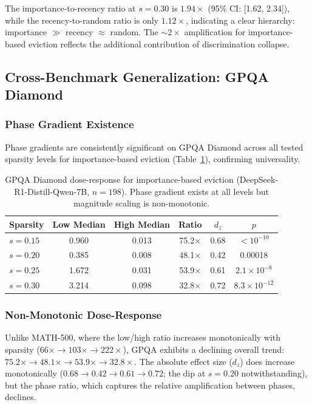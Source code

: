 \documentclass[11pt]{article}
\begin{document}
The importance-to-recency ratio at $s=0.30$ is $1.94\times$ (95\% CI: [1.62, 2.34]), while the recency-to-random ratio is only $1.12\times$, indicating a clear hierarchy: importance $\gg$ recency $\approx$ random. The $\sim$$2\times$ amplification for importance-based eviction reflects the additional contribution of discrimination collapse.

\subsection{Cross-Benchmark Generalization: GPQA Diamond}

\subsubsection{Phase Gradient Existence}

Phase gradients are consistently significant on GPQA Diamond across all tested sparsity levels for importance-based eviction (Table~\ref{tab:gpqa_full}), confirming universality.

\begin{table}[h]
\centering
\caption{GPQA Diamond dose-response for importance-based eviction (DeepSeek-R1-Distill-Qwen-7B, $n=198$). Phase gradient exists at all levels but magnitude scaling is non-monotonic.}
\label{tab:gpqa_full}
\begin{tabular}{lccccc}
\toprule
Sparsity & Low Median & High Median & Ratio & $d_z$ & $p$ \\
\midrule
$s=0.15$ & 0.960 & 0.013 & 75.2$\times$ & 0.68 & $<10^{-10}$ \\
$s=0.20$ & 0.385 & 0.008 & 48.1$\times$ & 0.42 & 0.00018 \\
$s=0.25$ & 1.672 & 0.031 & 53.9$\times$ & 0.61 & $2.1 \times 10^{-8}$ \\
$s=0.30$ & 3.214 & 0.098 & 32.8$\times$ & 0.72 & $8.3 \times 10^{-12}$ \\
\bottomrule
\end{tabular}
\end{table}

\subsubsection{Non-Monotonic Dose-Response}

Unlike MATH-500, where the low/high ratio increases monotonically with sparsity ($66\times \to 103\times \to 222\times$), GPQA exhibits a declining overall trend: $75.2\times \to 48.1\times \to 53.9\times \to 32.8\times$. The absolute effect size ($d_z$) does increase monotonically ($0.68 \to 0.42 \to 0.61 \to 0.72$; the dip at $s=0.20$ notwithstanding), but the phase ratio, which captures the relative amplification between phases, declines.
\end{document}
